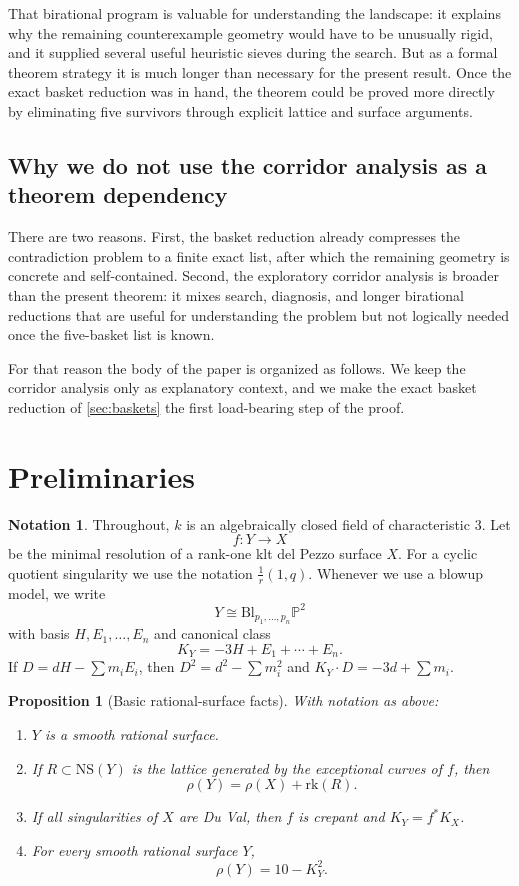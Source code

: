 \documentclass[11pt]{article}
\newtheorem{proposition}[proposition]{Proposition}
\theoremstyle{definition}
\newtheorem{notation}[notation]{Notation}
\newcommand{\Pbb}{\mathbb P}
\newcommand{\NS}{\mathrm{NS}}
\newcommand{\rk}{\mathrm{rk}}
\newcommand{\Bl}{\mathrm{Bl}}
\begin{document}
That birational program is valuable for understanding the landscape: it explains why the remaining counterexample geometry would have to be unusually rigid, and it supplied several useful heuristic sieves during the search. But as a formal theorem strategy it is much longer than necessary for the present result. Once the exact basket reduction was in hand, the theorem could be proved more directly by eliminating five survivors through explicit lattice and surface arguments.

\subsection*{Why we do not use the corridor analysis as a theorem dependency}
There are two reasons.
First, the basket reduction already compresses the contradiction problem to a finite exact list, after which the remaining geometry is concrete and self-contained. Second, the exploratory corridor analysis is broader than the present theorem: it mixes search, diagnosis, and longer birational reductions that are useful for understanding the problem but not logically needed once the five-basket list is known.

For that reason the body of the paper is organized as follows. We keep the corridor analysis only as explanatory context, and we make the exact basket reduction of \cref{sec:baskets} the first load-bearing step of the proof.

\section{Preliminaries}\label{sec:prelim}

\begin{notation}
Throughout, $k$ is an algebraically closed field of characteristic $3$. Let
\[
f\colon Y\to X
\]
be the minimal resolution of a rank-one klt del Pezzo surface $X$. For a cyclic quotient singularity we use the notation $\frac1r(1,q)$. Whenever we use a blowup model, we write
\[
Y\cong \Bl_{p_1,\dots,p_n}\Pbb^2
\]
with basis $H,E_1,\dots,E_n$ and canonical class
\[
K_Y=-3H+E_1+\cdots+E_n.
\]
If $D=dH-\sum m_iE_i$, then $D^2=d^2-\sum m_i^2$ and $K_Y\cdot D=-3d+\sum m_i$.
\end{notation}

\begin{proposition}[Basic rational-surface facts]\label{prop:basic}
With notation as above:
\begin{enumerate}[label=\textup{(\roman*)}]
\item $Y$ is a smooth rational surface.
\item If $R\subset \NS(Y)$ is the lattice generated by the exceptional curves of $f$, then
\[
\rho(Y)=\rho(X)+\rk(R).
\]
\item If all singularities of $X$ are Du Val, then $f$ is crepant and $K_Y=f^*K_X$.
\item For every smooth rational surface $Y$,
\[
\rho(Y)=10-K_Y^2.
\]
\end{enumerate}
\end{proposition}
\end{document}
